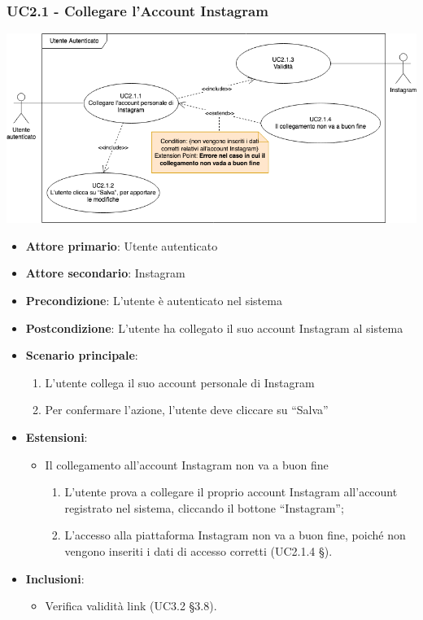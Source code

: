 \subsubsection{UC2.1 - Collegare l'Account Instagram}
\begin{center}
\includegraphics[scale=0.5]{UC_images/UC2_1.png}
\end{center}
\begin{itemize}
\item \textbf{Attore primario}: Utente autenticato
\item \textbf{Attore secondario}: Instagram
\item \textbf{Precondizione}: L’utente è autenticato nel sistema
\item \textbf{Postcondizione}: L’utente ha collegato il suo account Instagram al sistema

\item \textbf{Scenario principale}:
\begin{enumerate}
\item L’utente collega il suo account personale di Instagram
\item Per confermare l’azione, l’utente deve cliccare su “Salva” 
\end{enumerate}

\item \textbf{Estensioni}:
\begin{itemize}
\item Il collegamento all’account Instagram non va a buon fine
\begin{enumerate}
	\item L’utente prova a collegare il proprio account Instagram all’account registrato nel sistema, cliccando il bottone “Instagram”;
	\item L’accesso alla piattaforma Instagram non va a buon fine, poiché non vengono inseriti i dati di accesso corretti (UC2.1.4 §).
\end{enumerate}
\end{itemize}

\item \textbf{Inclusioni}:
\begin{itemize}
\item Verifica validità link (UC3.2 §3.8).
\end{itemize}
\end{itemize}

